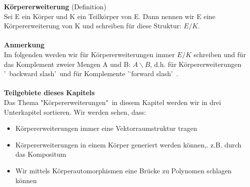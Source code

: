 \documentclass[a4paper, 10pt]{scrartcl}
\begin{document}
\textbf{Körpererweiterung} (Definition)\\
Sei E ein Körper und K ein Teilkörper von E. Dann nennen wir E eine Körpererweiterung von K und schreiben für diese Struktur: $E/K$.
\\
\\
\textbf{Anmerkung}\\
Im folgenden werden wir für Körpererweiterungen immer $E/K$ schreiben und für das Komplement zweier Mengen A und B: $A \backslash B$, d.h. für Körpererweiterungen '\ backward slash'\ und für Komplemente '˙forward slash'\ .
\\
\\
\textbf{Teilgebiete dieses Kapitels}\\
Das Thema "Körpererweiterungen"\ in diesem Kapitel werden wir in drei Unterkapitel sortieren. Wir werden sehen, dass:

\begin{itemize}

\item Körpererweiterungen immer eine Vektorraumstruktur tragen
\item Körpererweiterungen in einem Körper generiert werden können,. z.B. durch das Kompositum
\item Wir mittels Körperautomorphismen eine Brücke zu Polynomen schlagen können
\end{itemize}
\end{document}
